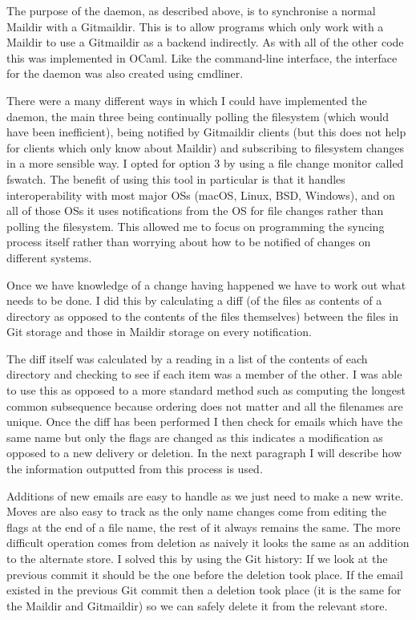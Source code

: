 The purpose of the daemon, as described above, is to synchronise a normal Maildir with a Gitmaildir. This is to allow programs which only work with a Maildir to use a Gitmaildir as a backend indirectly. As with all of the other code this was implemented in OCaml. Like the command-line interface, the interface for the daemon was also created using cmdliner.

There were a many different ways in which I could have implemented the daemon, the main three being continually polling the filesystem (which would have been inefficient), being notified by Gitmaildir clients (but this does not help for clients which only know about Maildir) and subscribing to filesystem changes in a more sensible way. I opted for option 3 by using a file change monitor called fswatch\cite{code_fswatch}. The benefit of using this tool in particular is that it handles interoperability with most major OSs (macOS, Linux, BSD, Windows), and on all of those OSs it uses notifications from the OS for file changes rather than polling the filesystem. This allowed me to focus on programming the syncing process itself rather than worrying about how to be notified of changes on different systems.

Once we have knowledge of a change having happened we have to work out what needs to be done. I did this by calculating a diff (of the files as contents of a directory as opposed to the contents of the files themselves) between the files in Git storage and those in Maildir storage on every notification.

The diff itself was calculated by a reading in a list of the contents of each directory and checking to see if each item was a member of the other. I was able to use this as opposed to a more standard method such as computing the longest common subsequence because ordering does not matter and all the filenames are unique. Once the diff has been performed I then check for emails which have the same name but only the flags are changed as this indicates a modification as opposed to a new delivery or deletion. In the next paragraph I will describe how the information outputted from this process is used.

Additions of new emails are easy to handle as we just need to make a new write. Moves are also easy to track as the only name changes come from editing the flags at the end of a file name, the rest of it always remains the same. The more difficult operation comes from deletion as naively it looks the same as an addition to the alternate store. I solved this by using the Git history: If we look at the previous commit it should be the one before the deletion took place. If the email existed in the previous Git commit then a deletion took place (it is the same for the Maildir and Gitmaildir) so we can safely delete it from the relevant store.

